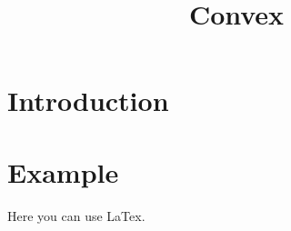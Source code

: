 \title{Convex}


\maketitle


\tableofcontents
\section{Introduction}



\section{Example}

\nocite{*} %

Here you can use LaTex.


